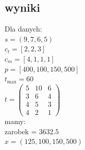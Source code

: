 \documentclass{report}
\begin{document}
\subsection*{wyniki}
Dla danych:\\
$s = (9,7,6,5)$\\
$c_t = [2,2,3]$\\
$c_m = [4,1,1,1]$\\
$p = [400, 100, 150, 500]$\\
$t_{\max} = 60$\\
$t = \begin{pmatrix}
    5 & 10 & 6 \\
    3 & 6 & 4 \\
    4 & 5 & 3 \\
    4 & 2 & 1
    \end{pmatrix}$\\
mamy:\\
zarobek = $3632.5$\\
$x = (125, 100, 150, 500)$
\end{document}
